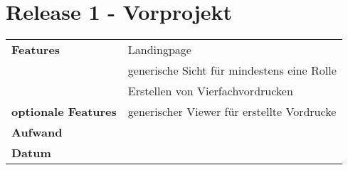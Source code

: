 \section*{Release 1 - Vorprojekt}
\label{sec:release_1}

\begin{tabular}{p{5cm} p{9cm}}
    \textbf{Features} & Landingpage \\
    & generische Sicht für mindestens eine Rolle \\
    & Erstellen von Vierfachvordrucken \\
    \textbf{optionale Features} & generischer Viewer für erstellte Vordrucke \\
    \hline
    \textbf{Aufwand} &  \\
    \hline
    \textbf{Datum} & 
\end{tabular}
